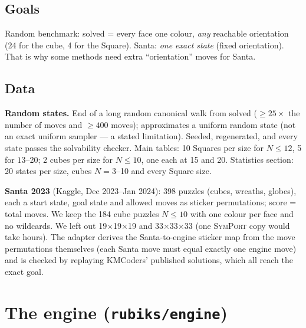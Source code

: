 \documentclass[10.5pt,a4paper]{article}
\newcommand{\Cu}[1]{#1$\times$#1$\times$#1}
\newcommand{\M}[1]{\textsc{#1}}
\begin{document}
\subsection{Goals}
Random benchmark: solved = every face one colour, \emph{any} reachable orientation (24 for the cube, 4 for the Square).
Santa: \emph{one exact state} (fixed orientation). That is why some methods need extra ``orientation'' moves for Santa.

\subsection{Data}
\textbf{Random states.} End of a long random canonical walk from solved ($\ge 25\times$ the number of moves and $\ge 400$ moves);
approximates a uniform random state (not an exact uniform sampler --- a stated limitation). Seeded, regenerated, and every state
passes the solvability checker. Main tables: 10 Squares per size for $N\le12$, 5 for $13$--20; 2 cubes per size for $N\le10$,
one each at 15 and 20. Statistics section: 20 states per size, cubes $N=3$--10 and every Square size.

\textbf{Santa 2023} (Kaggle, Dec 2023--Jan 2024): 398 puzzles (cubes, wreaths, globes), each a start state, goal state and
allowed moves as sticker permutations; score = total moves. We keep the 184 cube puzzles $N\le10$ with one colour per face and no
wildcards. We left out \Cu{19} and \Cu{33} (one \M{SymPort} copy would take hours). The adapter derives the Santa-to-engine sticker
map from the move permutations themselves (each Santa move must equal exactly one engine move) and is checked by replaying
KMCoders' published solutions, which all reach the exact goal.

\section{The engine (\texttt{rubiks/engine})}
\end{document}
